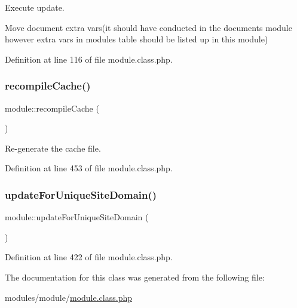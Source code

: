 Execute update. 

Move document extra vars(it should have conducted in the documents module however extra vars in modules table should be listed up in this module)

Definition at line 116 of file module.\+class.\+php.

\hypertarget{classmodule_ad7b18470ccd972960f4a5ce81c7760ce}{}\label{classmodule_ad7b18470ccd972960f4a5ce81c7760ce} 
\subsubsection{\texorpdfstring{recompile\+Cache()}{recompileCache()}}
{\footnotesize\ttfamily module\+::recompile\+Cache (\begin{DoxyParamCaption}{ }\end{DoxyParamCaption})}



Re-\/generate the cache file. 



Definition at line 453 of file module.\+class.\+php.

\hypertarget{classmodule_a935bc2073b87fe979b8c1c7221174448}{}\label{classmodule_a935bc2073b87fe979b8c1c7221174448} 
\subsubsection{\texorpdfstring{update\+For\+Unique\+Site\+Domain()}{updateForUniqueSiteDomain()}}
{\footnotesize\ttfamily module\+::update\+For\+Unique\+Site\+Domain (\begin{DoxyParamCaption}{ }\end{DoxyParamCaption})}



Definition at line 422 of file module.\+class.\+php.



The documentation for this class was generated from the following file\+:\begin{DoxyCompactItemize}
\item 
modules/module/\hyperlink{module_8class_8php}{module.\+class.\+php}\end{DoxyCompactItemize}
